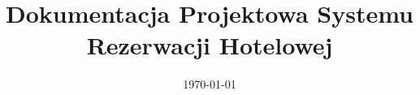 \documentclass[a4paper,12pt]{article}
\begin{document}
\title{Dokumentacja Projektowa Systemu Rezerwacji Hotelowej}
\author{}
\date{\today}
\maketitle

\tableofcontents
\newpage











\end{document}
